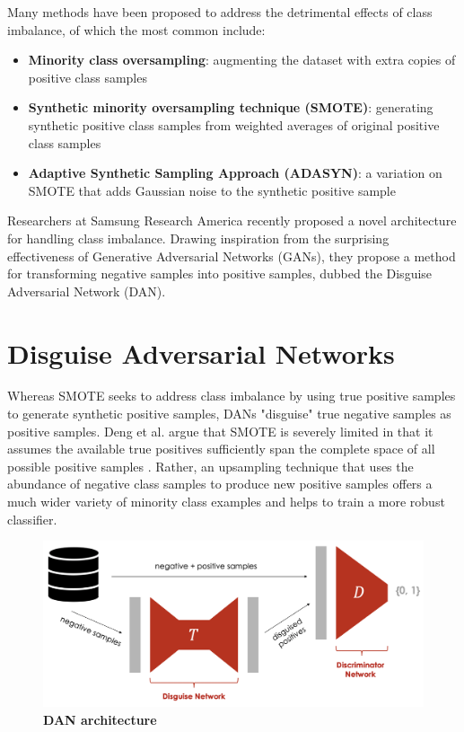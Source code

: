 \documentclass{proc}
\begin{document}
Many methods have been proposed to address the detrimental effects of class imbalance, of which the most common include:

\begin{itemize}
\item{\textbf{Minority class oversampling}}: augmenting the dataset with extra copies of positive class samples
\item{\textbf{Synthetic minority oversampling technique (SMOTE)}}: generating synthetic positive class samples from weighted averages of original positive class samples \cite{SMOTE}
\item{\textbf{Adaptive Synthetic Sampling Approach (ADASYN)}}: a variation on SMOTE that adds Gaussian noise to the synthetic positive sample \cite{ADASYN}
\end{itemize} 

Researchers at Samsung Research America \cite{DAN} recently proposed a novel architecture for handling class imbalance. Drawing inspiration from the surprising effectiveness of Generative Adversarial Networks (GANs), they propose a method for transforming negative samples into positive samples, dubbed the Disguise Adversarial Network (DAN). 

\section{Disguise Adversarial Networks}

Whereas SMOTE seeks to address class imbalance by using true positive samples to generate synthetic positive samples, DANs "disguise" true negative samples as positive samples. Deng et al. argue that SMOTE is severely limited in that it assumes the available true positives sufficiently span the complete space of all possible positive samples \cite{DAN}. Rather, an upsampling technique that uses the abundance of negative class samples to produce new positive samples offers a much wider variety of minority class examples and helps to train a more robust classifier.

\begin{figure}[h!]
		\includegraphics*[scale=0.21]{../figures/architecture.png}
		\caption{\textbf{DAN architecture}}
		\label{fig:architecture}
\end{figure}
\end{document}
